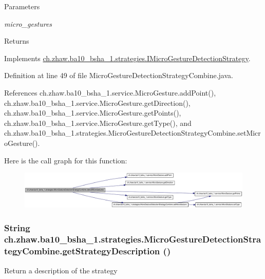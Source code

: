 \begin{DoxyParams}{Parameters}
\item[{\em micro\_\-gestures}]\end{DoxyParams}
\begin{DoxyReturn}{Returns}

\end{DoxyReturn}


Implements \hyperlink{interfacech_1_1zhaw_1_1ba10__bsha__1_1_1strategies_1_1IMicroGestureDetectionStrategy_a8593331fb67e5d4dc890d3db9f2d1b58}{ch.zhaw.ba10\_\-bsha\_\-1.strategies.IMicroGestureDetectionStrategy}.

Definition at line 49 of file MicroGestureDetectionStrategyCombine.java.

References ch.zhaw.ba10\_\-bsha\_\-1.service.MicroGesture.addPoint(), ch.zhaw.ba10\_\-bsha\_\-1.service.MicroGesture.getDirection(), ch.zhaw.ba10\_\-bsha\_\-1.service.MicroGesture.getPoints(), ch.zhaw.ba10\_\-bsha\_\-1.service.MicroGesture.getType(), and ch.zhaw.ba10\_\-bsha\_\-1.strategies.MicroGestureDetectionStrategyCombine.setMicroGesture().

Here is the call graph for this function:\nopagebreak
\begin{figure}[H]
\begin{center}
\leavevmode
\includegraphics[width=420pt]{classch_1_1zhaw_1_1ba10__bsha__1_1_1strategies_1_1MicroGestureDetectionStrategyCombine_a5487e41dc2d1b6dbe493b5a8420c050f_cgraph}
\end{center}
\end{figure}
\hypertarget{classch_1_1zhaw_1_1ba10__bsha__1_1_1strategies_1_1MicroGestureDetectionStrategyCombine_adf4547ec5056bf340c60f15ba50330bc}{
\subsubsection[{getStrategyDescription}]{\setlength{\rightskip}{0pt plus 5cm}String ch.zhaw.ba10\_\-bsha\_\-1.strategies.MicroGestureDetectionStrategyCombine.getStrategyDescription ()}}
\label{classch_1_1zhaw_1_1ba10__bsha__1_1_1strategies_1_1MicroGestureDetectionStrategyCombine_adf4547ec5056bf340c60f15ba50330bc}
Return a description of the strategy

